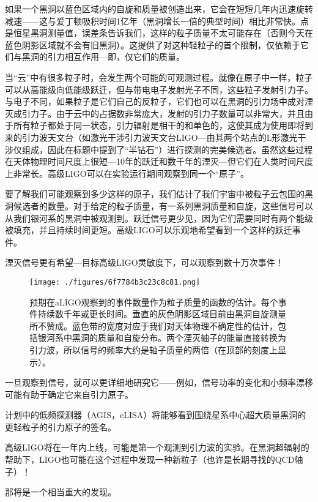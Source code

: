如果一个黑洞以蓝色区域内的自旋和质量被创造出来，它会在短短几年内迅速旋转减速——这与爱丁顿吸积时间1亿年（黑洞增长一倍的典型时间）相比非常快。点是恒星黑洞测量值，误差条告诉我们，这样的粒子质量不太可能存在（否则今天在蓝色阴影区域就不会有旧黑洞）。这提供了对这种轻粒子的首个限制，仅依赖于它们与黑洞的引力相互作用—即，仅它们的质量。

当“云”中有很多粒子时，会发生两个可能的可观测过程。就像在原子中一样，粒子可以从高能级向低能级跃迁，但与带电电子发射光子不同，这些粒子发射引力子。与电子不同，如果粒子是它们自己的反粒子，它们也可以在黑洞的引力场中成对湮灭成引力子。由于云中的占据数非常庞大，发射的引力子数量可以非常大，并且由于所有粒子都处于同一状态，引力辐射是相干的和单色的，这使其成为使用即将到来的引力波天文台（如激光干涉引力波天文台LIGO—由其两个站点的L形激光干涉仪组成，因此在标题中提到了“半钻石”）进行探测的完美候选者。虽然这些过程在天体物理时间尺度上很短—10年的跃迁和数千年的湮灭—但它们在人类时间尺度上非常长。高级LIGO可以在实验运行期间观察到同一个“原子”。

要了解我们可能观察到多少这样的原子，我们估计了我们宇宙中被粒子云包围的黑洞候选者的数量。对于给定的粒子质量，有一系列黑洞质量和自旋，这些信号可以从我们银河系的黑洞中被观测到。跃迁信号更少见，因为它们需要同时有两个能级被填充，并且持续时间更短。高级LIGO可以乐观地希望看到一个这样的跃迁事件。

湮灭信号更有希望—目标高级LIGO灵敏度下，可以观察到数十万次事件！

\begin{figure}[ht]
\centering
\texttt{[image: ./figures/6f7784b3c23c8c81.png]}
\caption{预期在aLIGO观察到的事件数量作为粒子质量的函数的估计。每个事件持续数千年或更长时间。垂直的灰色阴影区域目前由黑洞自旋测量所不赞成。蓝色带的宽度对应于我们对天体物理不确定性的估计，包括银河系中黑洞的质量和自旋分布。两个湮灭轴子的能量直接转换为引力波，所以信号的频率大约是轴子质量的两倍（在顶部的刻度上显示）。} \label{fig_GAtom_4}
\end{figure}


一旦观察到信号，就可以更详细地研究它——例如，信号功率的变化和小频率漂移可能有助于确定它来自引力原子。

计划中的低频探测器（AGIS，eLISA）将能够看到围绕星系中心超大质量黑洞的更轻粒子的引力原子的签名。

高级LIGO将在一年内上线，可能是第一个观测到引力波的实验。在黑洞超辐射的帮助下，LIGO也可能在这个过程中发现一种新粒子（也许是长期寻找的QCD轴子）！

那将是一个相当重大的发现。





